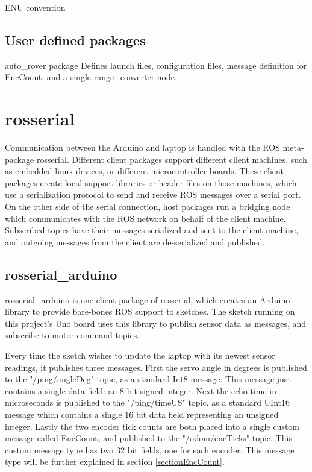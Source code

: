 ENU convention


\subsection{User defined packages}
auto\_rover package
Defines launch files, configuration files, message definition for EncCount, and a single range\_converter node. 


\section{rosserial} \label{sectionRosSerial}
Communication between the Arduino and laptop is handled with the ROS meta-package rosserial. Different client packages support different client machines, such as embedded linux devices, or different microcontroller boards. These client packages create local support libraries or header files on those machines, which use a serialization protocol to send and receive ROS messages over a serial port. On the other side of the serial connection, host packages run a bridging node which communicates with the ROS network on behalf of the client machine. Subscribed topics have their messages serialized and sent to the client machine, and outgoing messages from the client are de-serialized and published. 

\subsection{rosserial\_arduino}
rosserial\_arduino is one client package of rosserial, which creates an Arduino library to provide bare-bones ROS support to sketches. The sketch running on this project's Uno board uses this library to publish sensor data as messages, and subscribe to motor command topics.

Every time the sketch wishes to update the laptop with its newest sensor readings, it publishes three messages. First the servo angle in degrees is published to the "/ping/angleDeg" topic, as a standard Int8 message. This message just contains a single data field: an 8-bit signed integer. Next the echo time in microseconds is published to the "/ping/timeUS" topic, as a standard UInt16 message which contains a single 16 bit data field representing an unsigned integer. Lastly the two encoder tick counts are both placed into a single custom message called EncCount, and published to the "/odom/encTicks" topic. This custom message type has two 32 bit fields, one for each encoder. This message type will be further explained in section \ref{sectionEncCount}.


